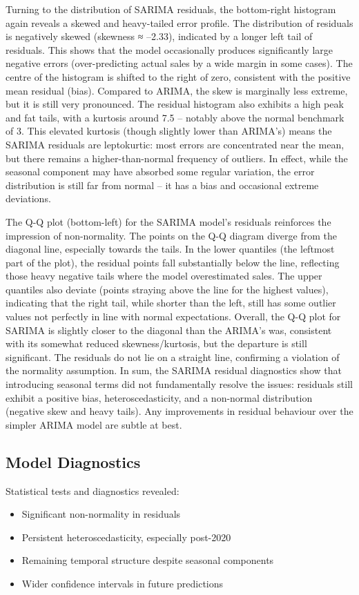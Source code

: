 \documentclass[12pt,a4paper]{report}
\begin{document}
Turning to the distribution of SARIMA residuals, the bottom-right histogram again reveals a skewed and heavy-tailed error profile. The distribution of residuals is negatively skewed (skewness ≈ –2.33), indicated by a longer left tail of residuals. This shows that the model occasionally produces significantly large negative errors (over-predicting actual sales by a wide margin in some cases). The centre of the histogram is shifted to the right of zero, consistent with the positive mean residual (bias). Compared to ARIMA, the skew is marginally less extreme, but it is still very pronounced. The residual histogram also exhibits a high peak and fat tails, with a kurtosis around 7.5 – notably above the normal benchmark of 3. This elevated kurtosis (though slightly lower than ARIMA's) means the SARIMA residuals are leptokurtic: most errors are concentrated near the mean, but there remains a higher-than-normal frequency of outliers. In effect, while the seasonal component may have absorbed some regular variation, the error distribution is still far from normal – it has a bias and occasional extreme deviations. 

The Q-Q plot (bottom-left) for the SARIMA model's residuals reinforces the impression of non-normality. The points on the Q-Q diagram diverge from the diagonal line, especially towards the tails. In the lower quantiles (the leftmost part of the plot), the residual points fall substantially below the line, reflecting those heavy negative tails where the model overestimated sales. The upper quantiles also deviate (points straying above the line for the highest values), indicating that the right tail, while shorter than the left, still has some outlier values not perfectly in line with normal expectations. Overall, the Q-Q plot for SARIMA is slightly closer to the diagonal than the ARIMA's was, consistent with its somewhat reduced skewness/kurtosis, but the departure is still significant. The residuals do not lie on a straight line, confirming a violation of the normality assumption. In sum, the SARIMA residual diagnostics show that introducing seasonal terms did not fundamentally resolve the issues: residuals still exhibit a positive bias, heteroscedasticity, and a non-normal distribution (negative skew and heavy tails). Any improvements in residual behaviour over the simpler ARIMA model are subtle at best.

\subsection{Model Diagnostics}
Statistical tests and diagnostics revealed:
\begin{itemize}
    \item Significant non-normality in residuals
    \item Persistent heteroscedasticity, especially post-2020
    \item Remaining temporal structure despite seasonal components
    \item Wider confidence intervals in future predictions
\end{itemize}
\end{document}
